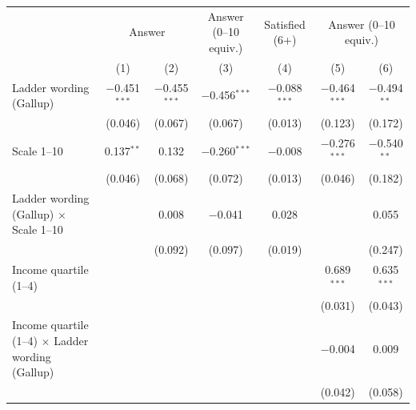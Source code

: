 
\begingroup
\centering
\begin{tabular}{lcccccc}
   \toprule
    & \multicolumn{2}{c}{Answer} & Answer (0--10 equiv.) & Satisfied (6+) & \multicolumn{2}{c}{Answer (0--10 equiv.)}\\
                                                                                  & (1)            & (2)            & (3)            & (4)            & (5)            & (6)\\  
   \midrule 
   Ladder wording (Gallup)                                                        & $-$0.451$^{***}$ & $-$0.455$^{***}$ & $-$0.456$^{***}$ & $-$0.088$^{***}$ & $-$0.464$^{***}$ & $-$0.494$^{**}$\\   
                                                                                  & (0.046)        & (0.067)        & (0.067)        & (0.013)        & (0.123)        & (0.172)\\   
   Scale 1--10                                                                    & 0.137$^{**}$   & 0.132          & $-$0.260$^{***}$ & $-$0.008         & $-$0.276$^{***}$ & $-$0.540$^{**}$\\   
                                                                                  & (0.046)        & (0.068)        & (0.072)        & (0.013)        & (0.046)        & (0.182)\\   
   Ladder wording (Gallup) $\times$ Scale 1--10                                   &                & 0.008          & $-$0.041         & 0.028          &                & 0.055\\   
                                                                                  &                & (0.092)        & (0.097)        & (0.019)        &                & (0.247)\\   
   Income quartile (1--4)                                                         &                &                &                &                & 0.689$^{***}$  & 0.635$^{***}$\\   
                                                                                  &                &                &                &                & (0.031)        & (0.043)\\   
   Income quartile (1--4) $\times$ Ladder wording (Gallup)                        &                &                &                &                & $-$0.004         & 0.009\\   
                                                                                  &                &                &                &                & (0.042)        & (0.058)\\   

\end{tabular}
